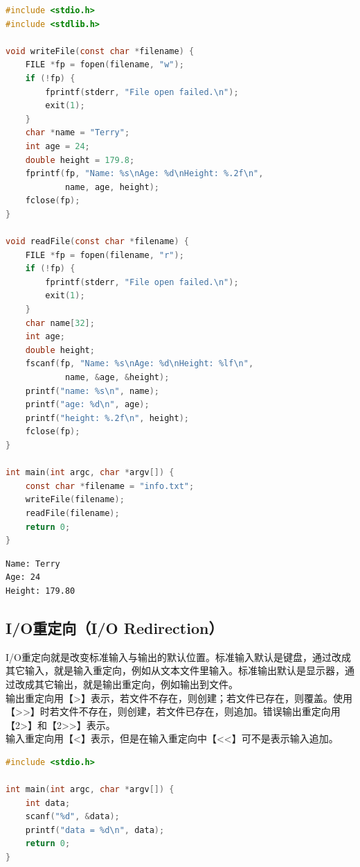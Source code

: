 \begin{lstlisting}[language=C]
#include <stdio.h>
#include <stdlib.h>

void writeFile(const char *filename) {
	FILE *fp = fopen(filename, "w");
	if (!fp) {
		fprintf(stderr, "File open failed.\n");
		exit(1);
	}
	char *name = "Terry";
	int age = 24;
	double height = 179.8;
	fprintf(fp, "Name: %s\nAge: %d\nHeight: %.2f\n",
			name, age, height);
	fclose(fp);
}

void readFile(const char *filename) {
	FILE *fp = fopen(filename, "r");
	if (!fp) {
		fprintf(stderr, "File open failed.\n");
		exit(1);
	}
	char name[32];
	int age;
	double height;
	fscanf(fp, "Name: %s\nAge: %d\nHeight: %lf\n",
			name, &age, &height);
	printf("name: %s\n", name);
	printf("age: %d\n", age);
	printf("height: %.2f\n", height);
	fclose(fp);
}

int main(int argc, char *argv[]) {
	const char *filename = "info.txt";
	writeFile(filename);
	readFile(filename);
	return 0;
}
\end{lstlisting}

\begin{tcolorbox}
	\begin{verbatim}
Name: Terry
Age: 24
Height: 179.80
	\end{verbatim}
\end{tcolorbox}

\vspace{0.5cm}

\subsection{I/O重定向（I/O Redirection）}

I/O重定向就是改变标准输入与输出的默认位置。标准输入默认是键盘，通过改成其它输入，就是输入重定向，例如从文本文件里输入。标准输出默认是显示器，通过改成其它输出，就是输出重定向，例如输出到文件。\\

输出重定向用【>】表示，若文件不存在，则创建；若文件已存在，则覆盖。使用【>>】时若文件不存在，则创建，若文件已存在，则追加。错误输出重定向用【2>】和【2>>】表示。\\

输入重定向用【<】表示，但是在输入重定向中【<<】可不是表示输入追加。\\


\begin{lstlisting}[language=C]
#include <stdio.h>

int main(int argc, char *argv[]) {
    int data;
    scanf("%d", &data);
    printf("data = %d\n", data);
    return 0;
}
\end{lstlisting}


